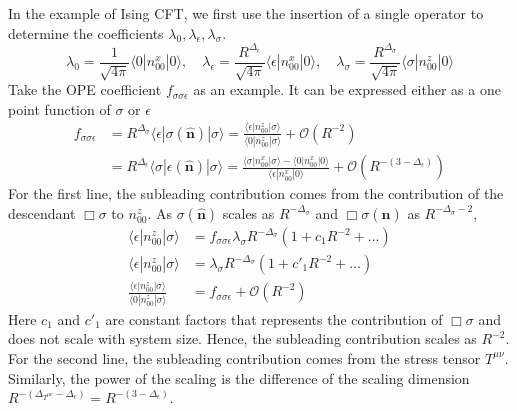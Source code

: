 \documentclass{timesjhep}
\begin{document}
In the example of Ising CFT, we first use the insertion of a single operator to determine the coefficients $\lambda_0,\lambda_\epsilon,\lambda_\sigma$. 
\begin{equation}
    \lambda_0=\frac{1}{\sqrt{4\pi}}\langle 0|n^x_{00}|0\rangle,\quad\lambda_\epsilon=\frac{R^{\Delta_\epsilon}}{\sqrt{4\pi}}\langle \epsilon|n^x_{00}|0\rangle,\quad\lambda_\sigma=\frac{R^{\Delta_\sigma}}{\sqrt{4\pi}}\langle \sigma|n^z_{00}|0\rangle
\end{equation} 
Take the OPE coefficient $f_{\sigma\sigma\epsilon}$ as an example. It can be expressed either as a one point function of $\sigma$ or $\epsilon$
\begin{align}
    f_{\sigma\sigma\epsilon}&=R^{\Delta_\sigma}\langle\epsilon|\sigma(\hat{\mathbf{n}})|\sigma\rangle=\frac{\langle\epsilon|n_{00}^z|\sigma\rangle}{\langle 0|n_{00}^z|\sigma\rangle}+\mathscr{O}(R^{-2})\nonumber\\     &=R^{\Delta_\epsilon}\langle\sigma|\epsilon(\hat{\mathbf{n}})|\sigma\rangle=\frac{\langle\sigma|n^x_{00}|\sigma\rangle-\langle0|n^x_{00}|0\rangle}{\langle\epsilon|n^x_{00}|0\rangle}+\mathscr{O}(R^{-(3-\Delta_\epsilon)}) 
\end{align} 
For the first line, the subleading contribution comes from the contribution of the descendant $\Box\sigma$ to $n_{00}^z$. As $\sigma(\hat{\mathbf{n}})$ scales as $R^{-\Delta_\sigma}$ and $\Box\sigma(\hat{\mathbf{n}})$ as $R^{-\Delta_\sigma-2}$, 
\begin{align}
    \langle\epsilon|n_{00}^z|\sigma\rangle&=f_{\sigma\sigma\epsilon}\lambda_\sigma R^{-\Delta_\sigma}(1+c_1R^{-2}+\dots)\nonumber\\
    \langle\epsilon|n_{00}^z|\sigma\rangle&=\lambda_\sigma R^{-\Delta_\sigma}(1+c'_1R^{-2}+\dots)\nonumber\\
    \frac{\langle\epsilon|n_{00}^z|\sigma\rangle}{\langle 0|n_{00}^z|\sigma\rangle}&=f_{\sigma\sigma\epsilon}+\mathscr{O}(R^{-2}) 
\end{align} 
Here $c_1$ and $c'_1$ are constant factors that represents the contribution of $\Box\sigma$ and does not scale with system size. Hence, the subleading contribution scales as $R^{-2}$. For the second line, the subleading contribution comes from the stress tensor $T^{\mu\nu}$. Similarly, the power of the scaling is the difference of the scaling dimension $R^{-(\Delta_{T^{\mu\nu}}-\Delta_\epsilon)}=R^{-(3-\Delta_\epsilon)}$. 
\end{document}
